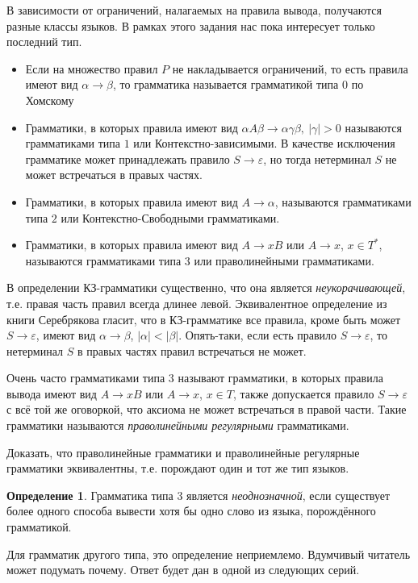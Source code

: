 \documentclass[12pt]{article}
\theoremstyle{definiton}
\theoremstyle{definition}
\theoremstyle{definition}
\newtheorem{Def}{Определение}
\let\eps\varepsilon
\newcounter{problem}
\newcounter{uproblem}
\newcounter{subproblem}
\def\upr{\medskip\noindent\stepcounter{uproblem}{\bf Упражнение \theuproblem .  }\setcounter{subproblem}{0} }
\begin{document}
В зависимости от ограничений, налагаемых на правила вывода, получаются разные классы языков. В рамках этого задания нас пока интересует только последний тип.
\begin{itemize}
	\item Если на множество правил $P$ не накладывается ограничений, то есть правила имеют вид $\alpha \to \beta$, то грамматика называется грамматикой типа $0$ по Хомскому
	\item Грамматики, в которых правила имеют вид $\alpha A \beta \to \alpha \gamma \beta,\ |\gamma| > 0 $ называются грамматиками типа $1$  или Контекстно-зависимыми. В качестве исключения грамматике может принадлежать правило $S \to \eps$, но тогда нетерминал $S$ не может встречаться в правых частях. 
	\item Грамматики, в которых правила имеют вид $A \to \alpha$, называются грамматиками типа $2$ или Контекстно-Свободными грамматиками.
	\item Грамматики, в которых правила имеют вид $A \to xB $ или  $A \to x $, $x \in T^*$, называются грамматиками типа $3$ или праволинейными грамматиками.
\end{itemize}

В определении КЗ-грамматики существенно, что она является \emph{неукорачивающей}, т.е. правая часть правил всегда длинее левой. Эквивалентное определение из книги Серебрякова гласит, что в КЗ-грамматике все правила, кроме быть может $S \to \eps$, имеют вид $ \alpha \to \beta $, $|\alpha| < |\beta|$. Опять-таки, если есть правило $S \to \eps$, то нетерминал $S$ в правых частях правил встречаться не может.


Очень часто грамматиками типа $3$ называют грамматики, в которых правила вывода имеют вид $A \to xB $ или  $A \to x $, $ x \in T $, также допускается правило $S \to \eps$  с всё той же оговоркой, что аксиома не может встречаться в правой части. Такие грамматики называются \emph{праволинейными регулярными} грамматиками.

\upr Доказать, что праволинейные грамматики и праволинейные регулярные грамматики эквивалентны, т.е. порождают один и тот же тип языков.

\begin{Def}
	Грамматика типа 3 является \emph{неоднозначной}, если существует более одного способа вывести хотя бы одно слово из языка, порождённого грамматикой.
\end{Def}

Для грамматик другого типа, это определение неприемлемо. Вдумчивый читатель может подумать почему. Ответ будет дан в одной из следующих серий.
\end{document}
